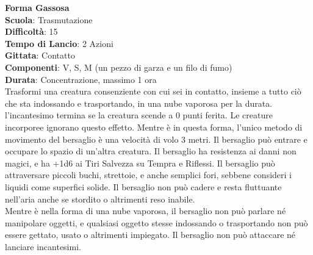 \begin{multicols}{2}
\medskip\textbf{Forma Gassosa}\\
\textbf{Scuola}: Trasmutazione\\
\textbf{Difficoltà}:  15\\
\textbf{Tempo di Lancio}: 2 Azioni\\
\textbf{Gittata}: Contatto\\
\textbf{Componenti}: V, S, M (un pezzo di garza e un filo di fumo)\\
\textbf{Durata}: Concentrazione, massimo 1 ora\\
Trasformi una creatura consenziente con cui sei in contatto, insieme a tutto ciò che sta indossando e trasportando, in una nube vaporosa per la durata. l'incantesimo termina se la creatura scende a 0 punti ferita. Le creature incorporee ignorano questo effetto. Mentre è in questa forma, l’unico metodo di movimento del bersaglio è una velocità di volo 3 metri. Il bersaglio può entrare e occupare lo spazio di un'altra creatura. Il bersaglio ha resistenza ai danni non magici, e ha +1d6 ai Tiri Salvezza su Tempra e Riflessi. Il bersaglio può attraversare piccoli buchi, strettoie, e anche semplici fori, sebbene consideri i liquidi come superfici solide. Il bersaglio non può cadere e resta fluttuante nell'aria anche se stordito o altrimenti reso inabile.\\
Mentre è nella forma di una nube vaporosa, il bersaglio non può parlare né manipolare oggetti, e qualsiasi oggetto stesse indossando o trasportando non può essere gettato, usato o altrimenti impiegato. Il bersaglio non può attaccare né lanciare incantesimi. 


\end{multicols}
